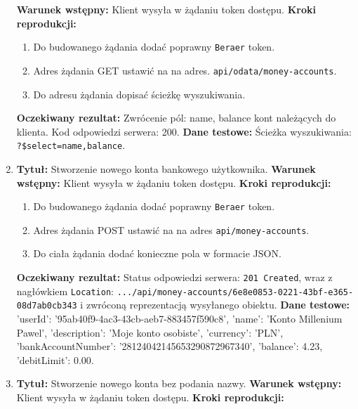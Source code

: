 \begin{enumerate}[labelwidth=1em,label=\Roman*]
    \textbf{Warunek wstępny:} Klient wysyła w żądaniu token dostępu. \newline
    \textbf{Kroki reprodukcji:}  \begin{enumerate}[label=\arabic*.]
        \item Do budowanego żądania dodać poprawny \texttt{Beraer} token.
        \item Adres żądania GET ustawić na na adres. \texttt{api/odata/money-accounts}.
        \item Do adresu żądania dopisać ścieżkę wyszukiwania.
    \end{enumerate}
    \textbf{Oczekiwany rezultat:}  Zwrócenie pól: name, balance kont należących do klienta. Kod odpowiedzi serwera: 200. \newline
    \textbf{Dane testowe:} Ścieżka wyszukiwania: \texttt{?\$select=name,balance}.
\item 
    \textbf{Tytuł:} Stworzenie nowego konta bankowego użytkownika. \newline
    \textbf{Warunek wstępny:} Klient wysyła w żądaniu token dostępu. \newline
    \textbf{Kroki reprodukcji:}  \begin{enumerate}[label=\arabic*.]
        \item Do budowanego żądania dodać poprawny \texttt{Beraer} token. 
        \item Adres żądania POST ustawić na na adres \texttt{api/money-accounts}.
        \item Do ciała żądania dodać konieczne pola w formacie JSON.
    \end{enumerate}
    \textbf{Oczekiwany rezultat:}  Status odpowiedzi serwera: \texttt{201 Created}, wraz z nagłówkiem \texttt{Location}: \texttt{.../api/money-accounts/6e8e0853-0221-43bf-e365-08d7ab0cb343} i zwróconą reprezentacją wysyłanego obiektu. \newline
    \textbf{Dane testowe:} 'userId': '95ab40f9-4ac3-43cb-aeb7-883457f590c8', 'name': 'Konto Millenium Pawel', 'description': 'Moje konto osobiste', 'currency': 'PLN', 'bankAccountNumber': '28124042145653290872967340', 'balance': 4.23, 'debitLimit': 0.00.
\item 
    \textbf{Tytuł:} Stworzenie nowego konta bez podania nazwy. \newline
    \textbf{Warunek wstępny:} Klient wysyła w żądaniu token dostępu. \newline
    \textbf{Kroki reprodukcji:}  \begin{enumerate}[label=\arabic*.]

\end{enumerate}
\end{enumerate}
